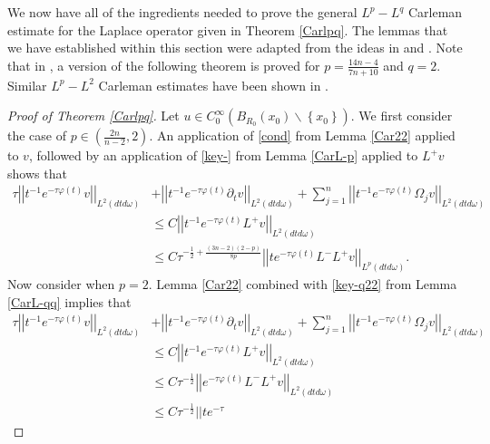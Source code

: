 \documentclass[11pt]{amsart}
\theoremstyle{plain}
\numberwithin{equation}{section}
\begin{document}
We now have all of the ingredients needed to prove the general $L^p
- L^q$ Carleman estimate for the Laplace operator given in Theorem
\ref{Carlpq}. The lemmas that we have established within this
section were adapted from the ideas in \cite{Reg99} and
\cite{Jer86}. Note that in \cite{Reg99}, a version of the following
theorem is proved for $p=\frac{14n-4}{7n+10}$ and $q = 2$. Similar
$L^p - L^2$ Carleman estimates have been shown in  \cite{BKRS88}.

\begin{proof}[Proof of Theorem \ref{Carlpq}]
Let $u\in C^{\infty}_{0}{\left( {B_{R_0}(x_0)\backslash{\left\{{x_0}\right\}} } \right) }$.
We first consider the case of $p \in {\left( {\frac{2n}{n-2}, 2} \right) }$.
An application of \eqref{cond} from Lemma \ref{Car22} applied to $v$, followed by an
application of \eqref{key-} from Lemma \ref{CarL-p} applied to $L^+v$ shows that
\begin{align*}
\tau {\left\vert\left\vert {t^{-1} e^{-\tau \varphi(t)}v}\right\vert\right\vert}_{L^2(dtd\omega )}
&+{\left\vert\left\vert {t^{-1}e^{-\tau \varphi(t)} \partial_t v}\right\vert\right\vert}_{L^2(dtd\omega )}
+\sum_{j=1}^n {\left\vert\left\vert {t^{-1}e^{-\tau \varphi(t)} \Omega_j v }\right\vert\right\vert}_{L^2(dtd\omega )}   \\
&\leq C{\left\vert\left\vert {t^{-1} e^{-\tau \varphi(t)} L^+v}\right\vert\right\vert}_{L^2(dtd\omega )} \\
&\le C\tau^{-\frac 1 2 + \frac{{\left( {3n-2} \right) }{\left( {2-p} \right) }}{8p}}{\left\vert\left\vert {t
e^{-\tau \varphi(t)} L^- L^+v}\right\vert\right\vert}_{L^p(dtd\omega )}.
\end{align*}
Now consider when $p = 2$.
Lemma \ref{Car22} combined with \eqref{key-q22} from Lemma \ref{CarL-qq} implies that
\begin{align*}
\tau {\left\vert\left\vert {t^{-1} e^{-\tau \varphi(t)}v}\right\vert\right\vert}_{L^2(dtd\omega )}
&+{\left\vert\left\vert {t^{-1}e^{-\tau \varphi(t)} \partial_t v}\right\vert\right\vert}_{L^2(dtd\omega )}
+\sum_{j=1}^n {\left\vert\left\vert {t^{-1}e^{-\tau \varphi(t)} \Omega_j v }\right\vert\right\vert}_{L^2(dtd\omega )}   \\
&\leq C{\left\vert\left\vert {t^{-1} e^{-\tau \varphi(t)} L^+v}\right\vert\right\vert}_{L^2(dtd\omega )} \\
&\le C\tau^{-\frac 1 2}{\left\vert\left\vert { e^{-\tau \varphi(t)} L^-
L^+v}\right\vert\right\vert}_{L^2(dtd\omega )} \\ &\le C\tau^{-\frac 1 2}{\left\vert\left\vert {t e^{-\tau
}}}
\end{align*}
\end{proof}
\end{document}
